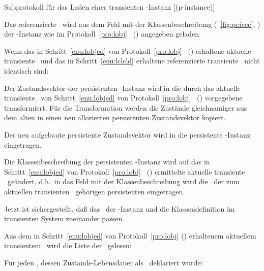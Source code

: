 \begin{infol}%
%
\acaption%
 {Subprotokoll f\"{u}r das Laden einer transienten
  \protect\clos-Instanz}%
 [(p-instance)]%
 \label{pro:lcli}%
%
\item\label{enu:lclcld} Das referenzierte \clsdo\ wird aus dem Feld
mit der Klassenbeschreibung (\figurename~\ref{fig:pcivec},
\citepage{\pageref{fig:pcivec}}) der \clos-Instanz wie im
Protokoll~\ref{pro:lobj}
\ (\citepage{\pageref{pro:lobj}}) angegeben
geladen.
%
\item\label{enu:lclse} Wenn das in Schritt~\ref{enu:lobjed} von
Protokoll~\ref{pro:lobj}
\ (\citepage{\pageref{enu:lobjed}}) erhaltene
aktuelle transiente \clsdo\ und das in Schritt~\ref{enu:lclcld}
erhaltene referenzierte transiente \clsdo\ nicht identisch sind:
%
\begin{block}%
%
\item Der Zustandsvektor der persistenten \clos-Instanz wird in
die durch das aktuelle transiente \clsdo\ von Schritt~\ref{enu:lobjed}
von Protokoll~\ref{pro:lobj}
\ (\citepage{\pageref{enu:lobjed}}) vorgegebene
\representation{} transformiert. F\"{u}r die Transformation werden die
Zust\"{a}nde gleichnamiger \Slt[s]\/ aus dem alten in einen neu
allozierten persistenten Zustandsvektor kopiert.
%
\item Der neu aufgebaute persistente Zustandsvektor wird in die
persistente \clos-Instanz eingetragen.
%
\item Die Klassenbeschreibung der persistenten \clos-Instanz wird auf
das in Schritt~\ref{enu:lobjed} von Protokoll~\ref{pro:lobj}
\ (\citepage{\pageref{enu:lobjed}}) ermittelte
aktuelle transiente \clsdo\ ge\-\"{a}n\-dert, d.h.\ in das Feld mit der
Klassenbeschreibung wird die \objid\ der zum aktuellen transienten
\clsdo\ geh\"{o}rigen persistenten \representation{} eingetragen. 
%
\end{block}%
%
Jetzt ist sichergestellt, da\ss{} das \clsdo\ der \clos-Instanz
und die Klassendefinition im transienten System zueinander passen.
%
\item Aus dem in Schritt~\ref{enu:lobjed} von Protokoll~\ref{pro:lobj}
 (\citepage{\pageref{enu:lobjed}}) erhaltenem
aktuellem transientem \clsdo\ wird die Liste der \sltdo[e]\ gelesen:\\ 
%
\item F\"{u}r jeden \Slt, dessen Zustands-Lebensdauer als
\ deklariert wurde:
%
\begin{block}

\end{block}
\end{infol}
